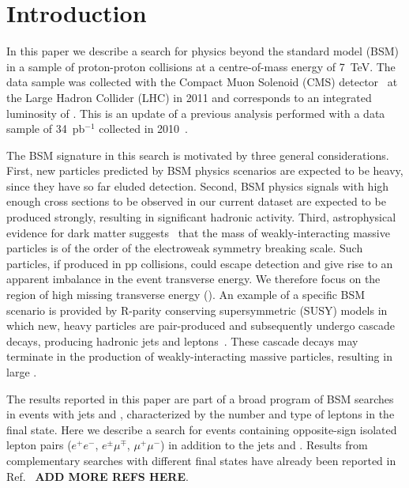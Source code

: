 \section{Introduction}
\label{sec:intro}

In this paper we describe a search for physics beyond the standard model (BSM) 
in a sample of proton-proton collisions at a centre-of-mass energy of 7~TeV. 
The data sample was collected with the Compact Muon Solenoid (CMS) detector~\cite{JINST} at 
the Large Hadron Collider (LHC) in 2011
and corresponds to an integrated luminosity of \lumifinal.
This is an update of a previous analysis performed with a data sample of 34~pb$^{-1}$
collected in 2010~\cite{ref:ospaper}.

The BSM signature in this search is motivated  by three general  considerations. 
First, new particles predicted by BSM
physics scenarios are expected to be heavy, since they have so far eluded detection.
Second, BSM physics  signals with  high
enough  cross sections to  be observed  in our  current dataset are expected to be
produced  strongly,  resulting  in  significant hadronic  activity. 
Third, astrophysical evidence for
dark matter  suggests~\cite{ref:DM,ref:DM2}  that the mass  of weakly-interacting
massive particles is of the  order of the electroweak symmetry breaking
scale. Such particles, if produced in pp collisions, could escape detection and give rise to
an apparent imbalance in the  event transverse energy. We therefore focus  on the
region  of  high missing transverse energy (\MET). An  example of  a  specific  BSM scenario  is
provided by R-parity conserving  supersymmetric (SUSY) models in which
new,  heavy  particles  are  pair-produced  and  subsequently  undergo
cascade       decays,      producing      hadronic       jets      and
leptons~\cite{Martin:fk,susy1,susy2,susy3,susy4,susy5,susy6}.  
These cascade decays  may terminate  in the
production  of weakly-interacting massive  particles,  resulting in large \MET.

The results reported in this paper are part of a broad program of BSM searches
in events with jets and \MET, characterized by the number and
type of leptons in the final state.  
Here we describe a search for events containing opposite-sign isolated
lepton pairs ($e^+e^-$, $e^{\pm}\mu^{\mp}$, $\mu^+\mu^-$) in addition to the jets
and \MET. Results from complementary searches with different final states have 
already been reported in Ref.~\cite{ref:RA1} {\bf ADD MORE REFS HERE}.

